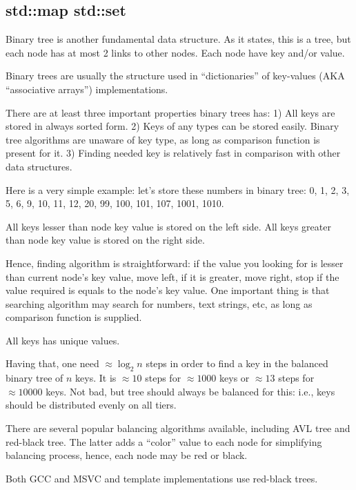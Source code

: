 \subsection{std::map \AndENRU std::set}

Binary tree is another fundamental data structure.
As it states, this is a tree, but each node has at most 2 links to other nodes.
Each node have key and/or value.

Binary trees are usually the structure used in ``dictionaries'' of key-values (\ac{AKA} ``associative arrays'') 
implementations.

There are at least three important properties binary trees has:
1) All keys are stored in always sorted form.
2) Keys of any types can be stored easily.
Binary tree algorithms are unaware of key type, as long as comparison function is present for it.
3) Finding needed key is relatively fast in comparison with other data structures.

Here is a very simple example: let's store these numbers in binary tree:
0, 1, 2, 3, 5, 6, 9, 10, 11, 12, 20, 99, 100, 101, 107, 1001, 1010.



All keys lesser than node key value is stored on the left side.
All keys greater than node key value is stored on the right side.

Hence, finding algorithm is straightforward: if the value you looking for is lesser than current node's key value,
move left, if it is greater, move right, stop if the value required is equals to the node's key value.
One important thing is that searching algorithm may search for numbers, text strings, etc, as long as 
comparison function is supplied.

All keys has unique values.

Having that, one need $\approx \log_{2} n$ steps in order to find a key in the balanced binary tree of $n$ keys.
It is $\approx 10$ steps for $\approx 1000$ keys or $\approx 13$ steps for $\approx 10000$ keys.
Not bad, but tree should always be balanced for this: i.e., keys should be distributed evenly on all tiers.

There are several popular balancing algorithms available, including AVL tree and red-black tree.
The latter adds a ``color'' value to each node for simplifying balancing process, hence, each node may be red or black.

Both GCC and MSVC  and  template implementations use red-black trees.

